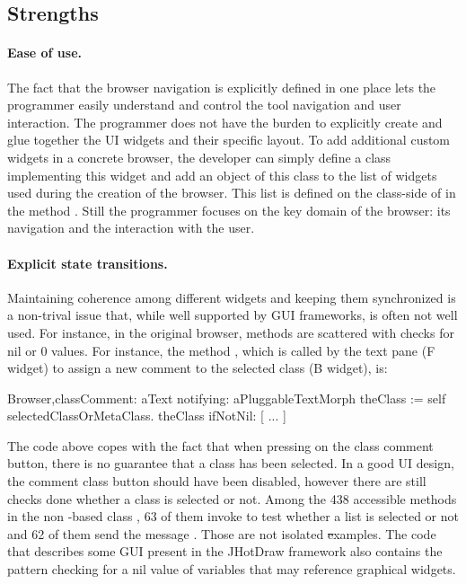 \documentclass[a4paper,10pt,twoside]{book}
\begin{document}
\subsection{Strengths}

\paragraph{Ease of use.}
The fact that the browser navigation is explicitly defined in one place lets the programmer easily understand and control the tool navigation and user interaction. The programmer does not have the burden to explicitly create and glue together the UI widgets and their specific layout. To add additional custom widgets in a concrete browser, the developer can simply define a class implementing this widget and add an object of this class to the list of widgets used during the creation of the browser. This list is defined on the class-side of  in the method . Still the programmer focuses on the key domain of the browser: its navigation and the interaction with the user. 

\paragraph{Explicit state transitions.} Maintaining coherence among different widgets and keeping them synchronized is a non-trival issue that, while well supported by GUI frameworks,  is often not well used. For instance, in the original \pharo browser, methods are scattered with checks for nil or 0 values. For instance, the method , which is called by the text pane (F widget) to assign a new comment to the selected class (B widget), is:

\begin{code}
Browser\sep{}classComment: aText notifying: aPluggableTextMorph 
    theClass := self selectedClassOrMetaClass.
    theClass
        ifNotNil: [ ... ]
\end{code}

The code above copes with the fact that when pressing on the class comment button, there is no guarantee that a class has been selected. In a good UI design, the comment class button should have been disabled, however there are still checks done whether a class is selected or not. Among the 438 accessible methods in the non \ob-based \pharo class , 63 of them invoke  to test whether a list is selected or not and 62 of them send the message . Those are not isolated \st examples. The code that describes some GUI present in the JHotDraw framework also contains the pattern checking for a nil value of variables that may reference graphical widgets. 
\end{document}

